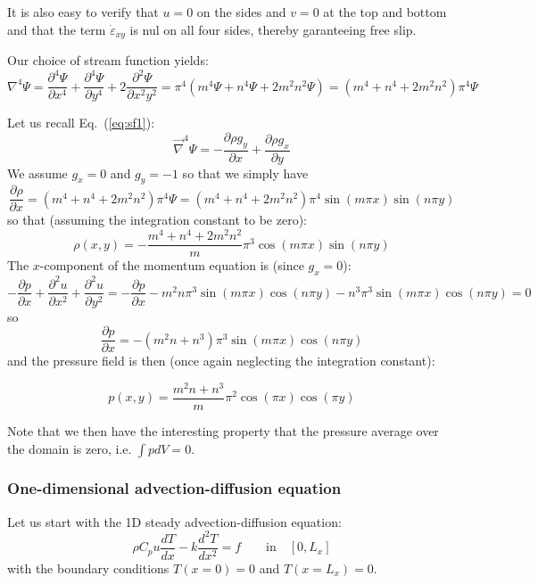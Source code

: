 It is also easy to verify that $u=0$ on the sides and $v=0$ at the top and bottom and that the 
term $\dot\varepsilon_{xy}$ is nul on all four sides, thereby garanteeing free slip. 

Our choice of stream function yields:
\[
{\nabla}^4 \Psi= 
\frac{\partial^4 \Psi}{\partial x^4}+
\frac{\partial^4 \Psi}{\partial y^4}+
2\frac{\partial^2 \Psi}{\partial x^2 y^2}
=\pi^4 ( m^4 \Psi + n^4 \Psi + 2m^2n^2 \Psi) = (m^4 + n^4 + 2m^2n^2)\pi^4 \Psi
\]

Let us recall Eq.~(\ref{eq:sf1}):
\begin{equation}
{\vec \nabla}^4 \Psi 
=
-\frac{\partial \rho g_y}{\partial x} + \frac{\partial \rho g_x}{\partial y}   
\end{equation}
We assume $g_x=0$ and $g_y=-1$ so that we simply have 
\begin{equation}
\frac{\partial \rho}{\partial x}
=
(m^4 + n^4 + 2m^2n^2)\pi^4 \Psi 
=
(m^4 + n^4 + 2m^2n^2)\pi^4 \sin( m \pi x)\sin( n\pi y)
\end{equation}
so that (assuming the integration constant to be zero):
\[
\rho(x,y) = -\frac{m^4 + n^4 + 2m^2n^2}{m} \pi^3  \cos(m \pi x)\sin(n \pi y)
\]
The $x$-component of the momentum equation is (since $g_x=0$): 
\[
-\frac{\partial p}{\partial x} + 
\frac{\partial^2 u}{\partial x^2}+
\frac{\partial^2 u}{\partial y^2} =
-\frac{\partial p}{\partial x} 
-m^2 n \pi^3 \sin (m\pi x)\cos(n\pi y)
- n^3 \pi^3 \sin (m\pi x)\cos(n\pi y)
=0
\]
so 
\[
\frac{\partial p}{\partial x} =-(m^2n+n^3)\pi^3 \sin (m\pi x)\cos(n \pi y)
\]
and the pressure field is then (once again neglecting the integration constant):
\begin{mdframed}[backgroundcolor=blue!5]
\[
p(x,y)= \frac{m^2n+n^3}{m} \pi^2 \cos (\pi x)\cos(\pi y)
\]
\end{mdframed}
Note that we then have the interesting property that the pressure average 
over the domain is zero, i.e. $\int p dV =0$.





\subsubsection{One-dimensional advection-diffusion equation \label{ss:advdiff} }

Let us start with the 1D steady advection-diffusion equation:
\begin{equation}
\rho C_p u \frac{dT}{dx} - k \frac{d^2T}{dx^2} = f \qquad \text{in} \quad [0,L_x]
\end{equation}
with the boundary conditions $T(x=0)=0$ and $T(x=L_x)=0$.

